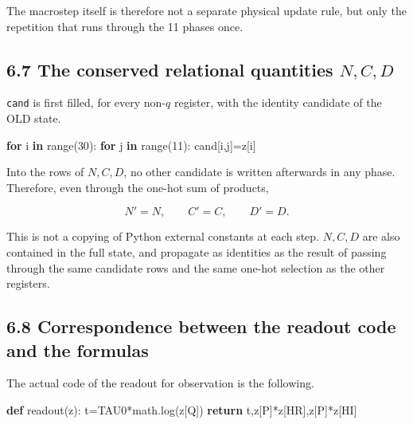 \documentclass[
  a4paper,
]{article}
\newenvironment{Shaded}{}{}
\newcommand{\BuiltInTok}[1]{\textcolor[rgb]{0.00,0.50,0.00}{#1}}
\newcommand{\ControlFlowTok}[1]{\textcolor[rgb]{0.00,0.44,0.13}{\textbf{#1}}}
\newcommand{\DecValTok}[1]{\textcolor[rgb]{0.25,0.63,0.44}{#1}}
\newcommand{\KeywordTok}[1]{\textcolor[rgb]{0.00,0.44,0.13}{\textbf{#1}}}
\newcommand{\NormalTok}[1]{#1}
\newcommand{\OperatorTok}[1]{\textcolor[rgb]{0.40,0.40,0.40}{#1}}
\begin{document}
The macrostep itself is therefore not a separate physical update rule,
but only the repetition that runs through the 11 phases once.

\subsection{\texorpdfstring{6.7 The conserved relational quantities
\(N,C,D\)}{6.7 The conserved relational quantities N,C,D}}\label{the-conserved-relational-quantities-ncd}

\texttt{cand} is first filled, for every non-\(q\) register, with the
identity candidate of the OLD state.

\begin{Shaded}
\begin{Highlighting}[]
\ControlFlowTok{for}\NormalTok{ i }\KeywordTok{in} \BuiltInTok{range}\NormalTok{(}\DecValTok{30}\NormalTok{):}
    \ControlFlowTok{for}\NormalTok{ j }\KeywordTok{in} \BuiltInTok{range}\NormalTok{(}\DecValTok{11}\NormalTok{):}
\NormalTok{        cand[i,j]}\OperatorTok{=}\NormalTok{z[i]}
\end{Highlighting}
\end{Shaded}

Into the rows of \(N,C,D\), no other candidate is written afterwards in
any phase. Therefore, even through the one-hot sum of products,

\[
\boxed{
N'=N,
\qquad
C'=C,
\qquad
D'=D.
}
\]

This is not a copying of Python external constants at each step.
\(N,C,D\) are also contained in the full state, and propagate as
identities as the result of passing through the same candidate rows and
the same one-hot selection as the other registers.

\subsection{6.8 Correspondence between the readout code and the
formulas}\label{correspondence-between-the-readout-code-and-the-formulas}

The actual code of the readout for observation is the following.

\begin{Shaded}
\begin{Highlighting}[]
\KeywordTok{def}\NormalTok{ readout(z):}
\NormalTok{    t}\OperatorTok{=}\NormalTok{TAU0}\OperatorTok{*}\NormalTok{math.log(z[Q])}
    \ControlFlowTok{return}\NormalTok{ t,z[P]}\OperatorTok{*}\NormalTok{z[HR],z[P]}\OperatorTok{*}\NormalTok{z[HI]}
\end{Highlighting}
\end{Shaded}
\end{document}
